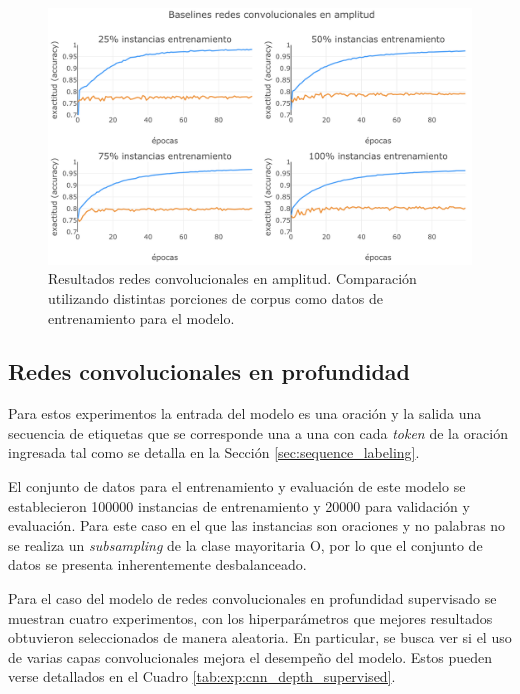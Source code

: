 \begin{figure}[t]
\begin{center}
\includegraphics[width=.9\linewidth]{images/CNN_wide_baselines_ratios.png}
\caption{Resultados redes convolucionales en amplitud. Comparación utilizando distintas porciones de corpus
como datos de entrenamiento para el modelo.}
\label{fig:CNN_wide_baselines_ratios}
\end{center}
\end{figure}

\subsection{Redes convolucionales en profundidad}\label{baseline:cnn:deep}

Para estos experimentos la entrada del modelo es una oración y la salida una secuencia de etiquetas que se 
corresponde una a una con cada \textit{token} de la oración ingresada tal como se detalla en la Sección 
\ref{sec:sequence_labeling}. 

El conjunto de datos para el entrenamiento y evaluación de este modelo se establecieron 100000 instancias de 
entrenamiento y 20000 para validación y evaluación. Para este caso en el que las instancias son oraciones y no
palabras no se realiza un \textit{subsampling} de la clase mayoritaria O, por lo que el conjunto de datos se 
presenta inherentemente desbalanceado. 

Para el caso del modelo de redes convolucionales en profundidad supervisado se muestran cuatro experimentos, 
con los hiperparámetros que mejores resultados obtuvieron seleccionados de manera aleatoria. En particular, se
busca ver si el uso de varias capas convolucionales mejora el desempeño del modelo. Estos pueden verse 
detallados en el Cuadro \ref{tab:exp:cnn_depth_supervised}.

